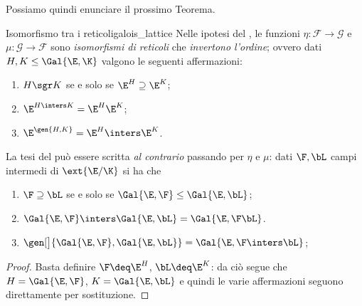 Possiamo quindi enunciare il prossimo Teorema.
\begin{theorem}
    {Isomorfismo tra i reticoli}{galois_lattice}
    Nelle ipotesi del , le funzioni $\eta : \mathscr{F} \to \mathscr{G}$ e $\mu : \mathscr{G} \to \mathscr{F}$ sono \emph{isomorfismi di reticoli} che \emph{invertono l'ordine}; ovvero dati $H, K \leq \Gal{\E, \K}$ valgono le seguenti affermazioni: \begin{enumerate}[(1)]
        \item $H \sgr K$ se e solo se $\E^H \supseteq \E^K$;
        \item $\E^{H \inters K} = \E^H\E^K$;
        \item $\E^{\gen{H, K}} = \E^H \inters \E^K$.    
    \end{enumerate} 
\end{theorem}

    

\begin{remark}
    La tesi del  può essere scritta \emph{al contrario} passando per $\eta$ e $\mu$: dati $\F, \bL$ campi intermedi di $\ext{\E / \K}$ si ha che
    \begin{enumerate}[(1)]
        \item $\F \supseteq \bL$ se e solo se $\Gal{\E, \F} \leq \Gal{\E, \bL}$;
        \item $\Gal{\E, \F} \inters \Gal{\E, \bL} = \Gal{\E, \F\bL}$. 
        \item $\gen[\big]{\Gal{\E, \F}, \Gal{\E, \bL}} = \Gal{\E, \F \inters \bL}$;
    \end{enumerate}

    \begin{proof}
        Basta definire $\F \deq \E^H$, $\bL \deq \E^K$: da ciò segue che $H = \Gal{\E, \F}$, $K = \Gal{\E, \bL}$ e quindi le varie affermazioni seguono direttamente per sostituzione. 
    \end{proof}
\end{remark}

